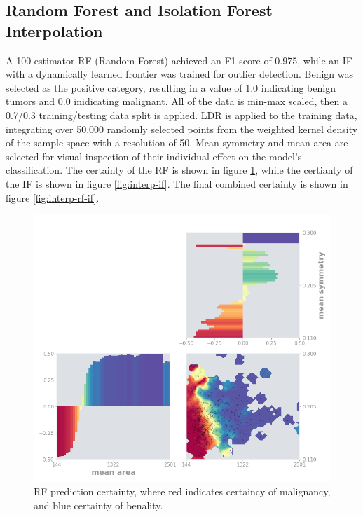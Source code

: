 \documentclass[a4paper, oneside, twocolumn]{article}
\begin{document}
\subsection{Random Forest and Isolation Forest Interpolation}

A 100 estimator RF (Random Forest) \cite{liaw2002classification} achieved an F1 score of 0.975, while an IF with a dynamically learned frontier was trained for outlier detection. Benign was selected as the positive category, resulting in a value of 1.0 indicating benign tumors and 0.0 inidicating malignant. All of the data is min-max scaled, then a 0.7/0.3 training/testing data split is applied. LDR is applied to the training data, integrating over 50,000 randomly selected points from the weighted kernel density of the sample space with a resolution of 50. Mean symmetry and mean area are selected for visual inspection of their individual effect on the model's classification. The certainty of the RF is shown in figure \ref{fig:interp-rf}, while the certianty of the IF is shown in figure \ref{fig:interp-if}. The final combined certainty is shown in figure \ref{fig:interp-rf-if}.

\begin{figure}
\centering
\includegraphics[width=0.8\columnwidth]{img/interp_rf.png}
\caption{RF prediction certainty, where red indicates certaincy of malignancy, and blue certainty of benality.}
\label{fig:interp-rf}
\end{figure}
\end{document}
